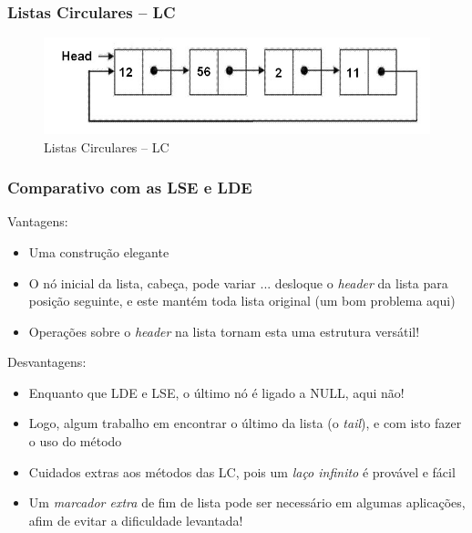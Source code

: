 
\begin{frame}%

\frametitle{Listas Circulares -- LC}

\begin{figure}[!hb]
	\centering
\includegraphics[height=0.30\paperheight, width=0.9\paperwidth]
{figs/fig_listas/lista_circular.jpg}						
			\caption{Listas Circulares -- LC}	
		\end{figure} 

\end{frame} 

\begin{frame}
\frametitle{Comparativo com as LSE e LDE}

\begin{block}{Vantagens:}
\begin{itemize}
  \item Uma construção elegante
  \item O nó inicial da lista,  cabeça, pode variar ... desloque o \textit{header}  da lista 
  para   posição seguinte, e este mantém toda lista original (um bom problema aqui)
  
  \item Operações sobre o \textit{header} na lista tornam esta uma estrutura versátil!
\end{itemize}
\end{block}

\begin{block}{Desvantagens:}
\begin{itemize}
  \item Enquanto que LDE e LSE, o último nó é ligado a NULL, aqui não!
  \item Logo, algum trabalho  em encontrar o último da lista (o \textit{tail}), e 
  com isto fazer o uso do método
  \item Cuidados extras aos métodos das LC, pois um \textit{laço infinito} é provável e fácil
  \item Um \textit{marcador extra} de fim de lista pode ser necessário em
  algumas aplicações, afim de evitar a dificuldade levantada!
\end{itemize}
\end{block}
\end{frame} 

